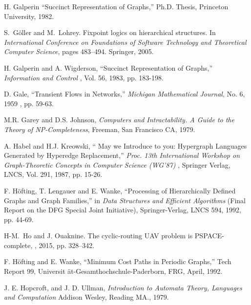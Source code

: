 \begin{thebibliography}{HMRR93}
 H. Galperin 
``Succinct Representation of Graphs,''
Ph.D. Thesis, Princeton University, 1982.


S.~G{\"o}ller and M.~Lohrey.
\newblock Fixpoint logics on hierarchical structures.
\newblock In {\em International Conference on Foundations of Software
  Technology and Theoretical Computer Science}, pages 483--494. Springer, 2005.



H. Galperin and A. Wigderson,
``Succinct Representation of Graphs,''
{\em Information and Control }, 
Vol. 56, 1983, pp. 183-198.






D. Gale,
``Transient Flows in Networks,''
{\em Michigan Mathematical Journal},
No. 6, 1959 , pp. 59-63.





M.R. Garey and  D.S. Johnson,
{\em Computers and Intractability. A Guide to the Theory of NP-Completeness},
Freeman, San Francisco CA, 1979.





A. Habel and H.J. Kreowski,
`` May we Introduce to you: Hypergraph Languages Generated by 
Hyperedge Replacement,'' 
{\em Proc. 13th International 
Workshop on Graph-Theoretic Concepts in Computer Science (WG'87) }, 
Springer Verlag, LNCS, Vol. 291, 1987, pp. 15-26.




F. H\"ofting, T. Lengauer and E. Wanke,
``Processing of Hierarchically Defined Graphs and 
Graph Families,'' in
{\em Data Structures and Efficient Algorithms}
(Final Report on the DFG Special Joint Initiative),
Springer-Verlag, LNCS 594, 1992, pp. 44-69.

H-M.~Ho and J.  Ouaknine. 
\newblock The cyclic-routing UAV problem is PSPACE-complete,
, 2015, pp. 328--342.

F. H\"ofting and E. Wanke,
``Minimum Cost Paths in Periodic  Graphs,''
Tech Report 99, Universit \"at-Gesamthochschule-Paderborn, FRG,  
April, 1992. 



J. E. Hopcroft, and J. D. Ullman,
{\em Introduction to Automata Theory, Languages and Computation}
Addison Wesley, Reading MA., 1979.





\end{thebibliography}
